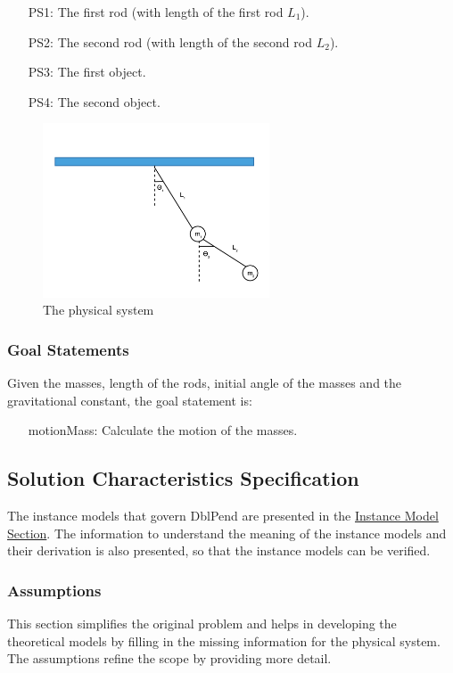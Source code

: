 \documentclass[12pt]{article}
\begin{document}
\begin{itemize}
\item[PS1:]{The first rod (with length of the first rod ${L_{1}}$).}
\item[PS2:]{The second rod (with length of the second rod ${L_{2}}$).}
\item[PS3:]{The first object.}
\item[PS4:]{The second object.}
\end{itemize}
\begin{figure}
\begin{center}
\includegraphics[width=0.6\textwidth]{../../../../datafiles/dblpend/dblpend.png}
\caption{The physical system}
\label{Figure:dblpend}
\end{center}
\end{figure}
\subsubsection{Goal Statements}
\label{Sec:GoalStmt}
Given the masses, length of the rods, initial angle of the masses and the gravitational constant, the goal statement is:

\begin{itemize}
\item[motionMass:\phantomsection\label{motionMass}]{Calculate the motion of the masses.}
\end{itemize}
\subsection{Solution Characteristics Specification}
\label{Sec:SolCharSpec}
The instance models that govern DblPend are presented in the \hyperref[Sec:IMs]{Instance Model Section}. The information to understand the meaning of the instance models and their derivation is also presented, so that the instance models can be verified.

\subsubsection{Assumptions}
\label{Sec:Assumps}
This section simplifies the original problem and helps in developing the theoretical models by filling in the missing information for the physical system. The assumptions refine the scope by providing more detail.
\end{document}
